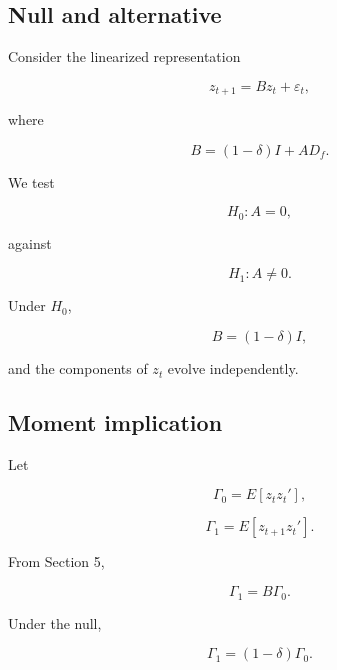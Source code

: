 \documentclass[12pt]{article}
\numberwithin{equation}{section}
\begin{document}
\subsection{Null and alternative}

Consider the linearized representation

\begin{equation}
z_{t+1}
=
B z_t
+
\varepsilon_t,
\label{eq:7.model}
\end{equation}

where

\begin{equation}
B
=
(1-\delta) I
+
A D_f.
\label{eq:7.operator}
\end{equation}

We test

\begin{equation}
H_0 : A = 0,
\label{eq:7.H0}
\end{equation}

against

\begin{equation}
H_1 : A \neq 0.
\label{eq:7.H1}
\end{equation}

Under $H_0$,

\begin{equation}
B = (1-\delta) I,
\label{eq:7.nullB}
\end{equation}

and the components of $z_t$ evolve independently.

\subsection{Moment implication}

Let

\begin{equation}
\Gamma_0
=
E[z_t z_t'],
\label{eq:7.gamma0}
\end{equation}

\begin{equation}
\Gamma_1
=
E[z_{t+1} z_t'].
\label{eq:7.gamma1}
\end{equation}

From Section 5,

\begin{equation}
\Gamma_1
=
B \Gamma_0.
\label{eq:7.restriction}
\end{equation}

Under the null,

\begin{equation}
\Gamma_1
=
(1-\delta) \Gamma_0.
\label{eq:7.nullmoment}
\end{equation}
\end{document}
